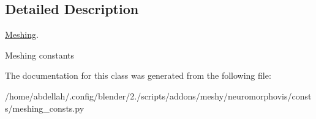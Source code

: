 \subsection{Detailed Description}
\hyperlink{classmeshy_1_1neuromorphovis_1_1consts_1_1meshing__consts_1_1Meshing}{Meshing}. 

\begin{DoxyVerb}Meshing constants
\end{DoxyVerb}
 

The documentation for this class was generated from the following file\+:\begin{DoxyCompactItemize}
\item 
/home/abdellah/.\+config/blender/2./scripts/addons/meshy/neuromorphovis/consts/meshing\+\_\+consts.\+py\end{DoxyCompactItemize}
